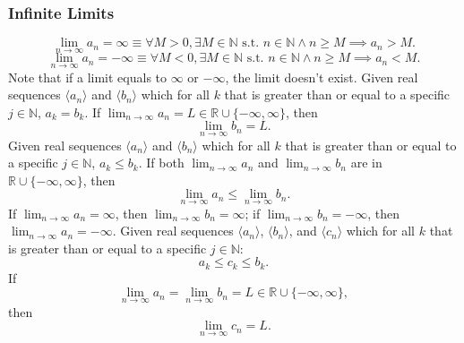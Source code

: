 \documentclass[a4paper,12pt]{report}
\begin{document}
\subsubsection{Infinite Limits}
\[\lim_{n\to \infty}a_n=\infty \equiv \forall M > 0, \exists M \in\mathbb{N} \text{\ s.t.\ } n\in\mathbb{N}\land n \geq M \implies a_n > M.\]
\[\lim_{n\to \infty}a_n=-\infty \equiv \forall M < 0, \exists M \in\mathbb{N} \text{\ s.t.\ } n\in\mathbb{N}\land n \geq M \implies a_n < M.\]
Note that if a limit equals to $\infty$ or $-\infty$, the limit doesn't exist.
Given real sequences $\langle a_n\rangle$ and $\langle b_n\rangle$ which for all $k$ that is greater than or equal to a specific $j\in \mathbb{N}$, $a_k=b_k$. If $\lim_{n\to\infty}a_n=L\in\mathbb{R}\cup\{-\infty,\infty\}$, then
\[\lim_{n\to\infty}b_n=L.\]
Given real sequences $\langle a_n\rangle$ and $\langle b_n\rangle$ which for all $k$ that is greater than or equal to a specific $j\in \mathbb{N}$, $a_k\leq b_k$. If both $\lim_{n\to\infty}a_n$ and $\lim_{n\to\infty}b_n$ are in $\mathbb{R}\cup\{-\infty,\infty\}$, then
\[\lim_{n\to\infty}a_n\leq\lim_{n\to\infty}b_n.\]
If $\lim_{n\to\infty}a_n=\infty$, then $\lim_{n\to\infty}b_n=\infty$; if $\lim_{n\to\infty}b_n=-\infty$, then $\lim_{n\to\infty}a_n=-\infty$.
Given real sequences $\langle a_n\rangle$, $\langle b_n\rangle$, and $\langle c_n\rangle$ which for all $k$ that is greater than or equal to a specific $j\in \mathbb{N}$:
\[a_k\leq c_k\leq b_k.\]
If
\[\lim_{n\to\infty}a_n=\lim_{n\to\infty}b_n=L\in\mathbb{R}\cup\{-\infty,\infty\},\]
then
\[\lim_{n\to\infty}c_n=L.\]
\end{document}
